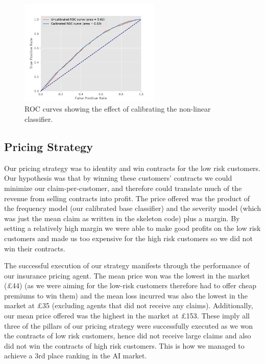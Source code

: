 \begin{figure}[h!]
    \centering
    \includegraphics[width=0.6\textwidth]{figures/calibrationROC.pdf}
    \caption[Part 3: ROC curves showing the effect of calibration]{ROC curves showing the effect of calibrating the non-linear classifier.}
    \label{fig:calibroc}
\end{figure}

\subsection{Pricing Strategy}

Our pricing strategy was to identity and win contracts for the low risk customers. Our hypothesis was that by winning these customers' contracts we could minimize our claim-per-customer, and therefore could translate much of the revenue from selling contracts into profit. The price offered was the product of the frequency model (our calibrated base classifier) and the severity model (which was just the mean claim as written in the skeleton code) plus a margin. By setting a relatively high margin we were able to make good profits on the low risk customers and made us too expensive for the high risk customers so we did not win their contracts.

The successful execution of our strategy manifests through the performance of our insurance pricing agent. The mean price won was the lowest in the market (£44) (as we were aiming for the low-risk customers therefore had to offer cheap premiums to win them) and the mean loss incurred was also the lowest in the market at £35 (excluding agents that did not receive any claims). Additionally, our mean price offered was the highest in the market at £153. These imply all three of the pillars of our pricing strategy were successfully executed as we won the contracts of low risk customers, hence did not receive large claims and also did not win the contracts of high risk customers. This is how we managed to achieve a 3rd place ranking in the AI market.

